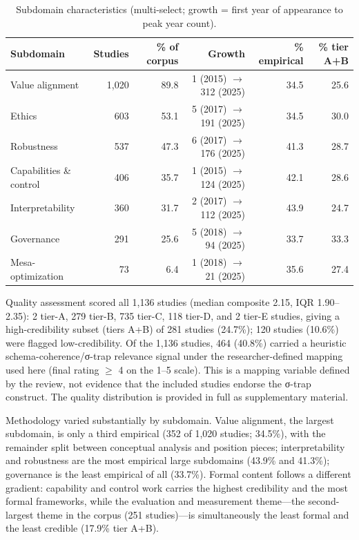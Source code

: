 \begin{table}[htbp]
\centering
\caption{Subdomain characteristics (multi-select; growth = first year of appearance to peak year count).}
\label{tab:subdomains}
\begin{tabular}{lrrrrr}
\toprule
Subdomain & Studies & \% of corpus & Growth & \% empirical & \% tier A+B \\
\midrule
Value alignment & 1,020 & 89.8 & 1 (2015) $\rightarrow$ 312 (2025) & 34.5 & 25.6 \\
Ethics & 603 & 53.1 & 5 (2017) $\rightarrow$ 191 (2025) & 34.5 & 30.0 \\
Robustness & 537 & 47.3 & 6 (2017) $\rightarrow$ 176 (2025) & 41.3 & 28.7 \\
Capabilities \& control & 406 & 35.7 & 1 (2015) $\rightarrow$ 124 (2025) & 42.1 & 28.6 \\
Interpretability & 360 & 31.7 & 2 (2017) $\rightarrow$ 112 (2025) & 43.9 & 24.7 \\
Governance & 291 & 25.6 & 5 (2018) $\rightarrow$ 94 (2025) & 33.7 & 33.3 \\
Mesa-optimization & 73 & 6.4 & 1 (2018) $\rightarrow$ 21 (2025) & 35.6 & 27.4 \\
\bottomrule
\end{tabular}
\end{table}

Quality assessment scored all 1,136 studies (median composite 2.15, IQR 1.90--2.35): 2 tier-A, 279 tier-B, 735 tier-C, 118 tier-D, and 2 tier-E studies, giving a high-credibility subset (tiers A+B) of 281 studies (24.7\%); 120 studies (10.6\%) were flagged low-credibility. Of the 1,136 studies, 464 (40.8\%) carried a heuristic schema-coherence/σ-trap relevance signal under the researcher-defined mapping used here (final rating $\geq$ 4 on the 1--5 scale). This is a mapping variable defined by the review, not evidence that the included studies endorse the σ-trap construct. The quality distribution is provided in full as supplementary material.

Methodology varied substantially by subdomain. Value alignment, the largest subdomain, is only a third empirical (352 of 1,020 studies; 34.5\%), with the remainder split between conceptual analysis and position pieces; interpretability and robustness are the most empirical large subdomains (43.9\% and 41.3\%); governance is the least empirical of all (33.7\%). Formal content follows a different gradient: capability and control work carries the highest credibility and the most formal frameworks, while the evaluation and measurement theme---the second-largest theme in the corpus (251 studies)---is simultaneously the least formal and the least credible (17.9\% tier A+B).

